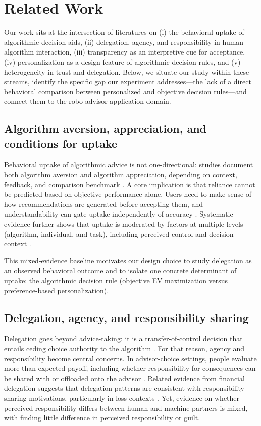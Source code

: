 \documentclass[a4paper, 12pt, fleqn]{article}
\theoremstyle{definition}
\begin{document}
\section{Related Work}
\label{sec:related}

Our work sits at the intersection of literatures on (i) the behavioral uptake of algorithmic decision aids, (ii) delegation, agency, and responsibility in human--algorithm interaction, (iii) transparency as an interpretive cue for acceptance, (iv) personalization as a design feature of algorithmic decision rules, and (v) heterogeneity in trust and delegation. Below, we situate our study within these streams, identify the specific gap our experiment addresses---the lack of a direct behavioral comparison between personalized and objective decision rules---and connect them to the robo-advisor application domain.

\subsection{Algorithm aversion, appreciation, and conditions for uptake}
Behavioral uptake of algorithmic advice is not one-directional: studies document both algorithm aversion and algorithm appreciation, depending on context, feedback, and comparison benchmark \citep{Dietvorst2018,Logg2019}. A core implication is that reliance cannot be predicted based on objective performance alone. Users need to make sense of how recommendations are generated before accepting them, and understandability can gate uptake independently of accuracy \citep{Yeomans2019}. Systematic evidence further shows that uptake is moderated by factors at multiple levels (algorithm, individual, and task), including perceived control and decision context \citep{Mahmud2022,Chugunova2022}.

This mixed-evidence baseline motivates our design choice to study delegation as an observed behavioral outcome and to isolate one concrete determinant of uptake: the algorithmic decision rule (objective EV maximization versus preference-based personalization).

\subsection{Delegation, agency, and responsibility sharing}
Delegation goes beyond advice-taking: it is a transfer-of-control decision that entails ceding choice authority to the algorithm \citep{Candrian2022}. For that reason, agency and responsibility become central concerns. In advisor-choice settings, people evaluate more than expected payoff, including whether responsibility for consequences can be shared with or offloaded onto the advisor \citep{Gazit2023}. Related evidence from financial delegation suggests that delegation patterns are consistent with responsibility-sharing motivations, particularly in loss contexts \citep{Werner2026}. Yet, evidence on whether perceived responsibility differs between human and machine partners is mixed, with \citet{Kirchkamp2019} finding little difference in perceived responsibility or guilt.
\end{document}
